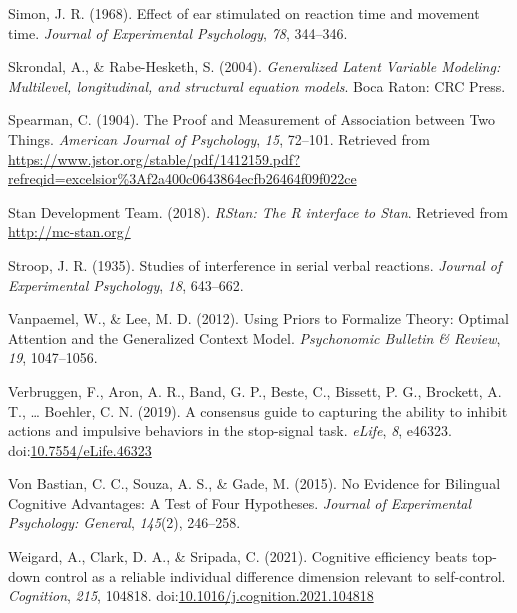 \documentclass[
  ,man]{apa6}
\newlength{\cslhangindent}
\newlength{\cslentryspacingunit} %
\newenvironment{CSLReferences}[2] %
 {%
  \setlength{\parindent}{0pt}
  \ifodd #1
  \let\oldpar\par
  \def\par{\hangindent=\cslhangindent\oldpar}
  \fi
  \setlength{\parskip}{#2\cslentryspacingunit}
 }%
 {}
\begin{document}
\begin{CSLReferences}{1}{0}
\leavevmode{}%
Simon, J. R. (1968). Effect of ear stimulated on reaction time and movement time. \emph{Journal of Experimental Psychology}, \emph{78}, 344--346.

\leavevmode{}%
Skrondal, A., \& Rabe-Hesketh, S. (2004). \emph{Generalized {Latent Variable Modeling}: Multilevel, longitudinal, and structural equation models}. {Boca Raton}: {CRC Press}.

\leavevmode{}%
Spearman, C. (1904). The {Proof} and {Measurement} of {Association} between {Two Things}. \emph{American Journal of Psychology}, \emph{15}, 72--101. Retrieved from \url{https://www.jstor.org/stable/pdf/1412159.pdf?refreqid=excelsior\%3Af2a400c0643864ecfb26464f09f022ce}

\leavevmode{}%
Stan Development Team. (2018). \emph{{RStan}: The {R} interface to {Stan}}. Retrieved from \url{http://mc-stan.org/}

\leavevmode{}%
Stroop, J. R. (1935). Studies of interference in serial verbal reactions. \emph{Journal of Experimental Psychology}, \emph{18}, 643--662.

\leavevmode{}%
Vanpaemel, W., \& Lee, M. D. (2012). Using {Priors} to {Formalize Theory}: {Optimal Attention} and the {Generalized Context Model}. \emph{Psychonomic Bulletin \& Review}, \emph{19}, 1047--1056.

\leavevmode{}%
Verbruggen, F., Aron, A. R., Band, G. P., Beste, C., Bissett, P. G., Brockett, A. T., \ldots{} Boehler, C. N. (2019). A consensus guide to capturing the ability to inhibit actions and impulsive behaviors in the stop-signal task. \emph{eLife}, \emph{8}, e46323. doi:\href{https://doi.org/10.7554/eLife.46323}{10.7554/eLife.46323}

\leavevmode{}%
Von Bastian, C. C., Souza, A. S., \& Gade, M. (2015). No {Evidence} for {Bilingual Cognitive Advantages}: {A Test} of {Four Hypotheses}. \emph{Journal of Experimental Psychology: General}, \emph{145}(2), 246--258.

\leavevmode{}%
Weigard, A., Clark, D. A., \& Sripada, C. (2021). Cognitive efficiency beats top-down control as a reliable individual difference dimension relevant to self-control. \emph{Cognition}, \emph{215}, 104818. doi:\href{https://doi.org/10.1016/j.cognition.2021.104818}{10.1016/j.cognition.2021.104818}


\end{CSLReferences}
\end{document}
